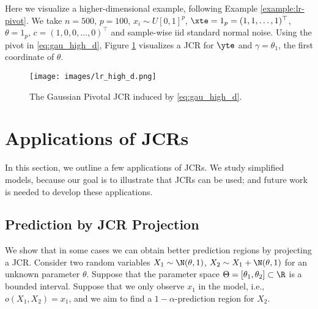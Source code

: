 \documentclass[english]{article}
\begin{document}
Here we visualize a 
higher-dimensional example, following Example \ref{example:lr-pivot}.
We take $n=500$, $p=100$, $x_i \sim U[0,1]^p$, $\xte = 1_p = (1,1,\ldots,1)^\top$, $\theta = 1_p$, $c=(1,0,0,\ldots,0)^\top$ and sample-wise iid standard normal noise.
Using the pivot in \eqref{eq:gau_high_d}, Figure \ref{fig:lr_high_d} visualizes a JCR for $\yte$ and $\gamma = \theta_1$, 
the first coordinate of $\theta$.  

\begin{figure}[ht]
    \centering
    \texttt{[image: images/lr\_high\_d.png]}
\caption{The Gaussian Pivotal JCR induced by \eqref{eq:gau_high_d}.}
\label{fig:lr_high_d}
\end{figure}
\fi

\section{Applications of JCRs}\label{sec:application}

In this section, we outline a few applications of JCRs.
We study simplified models, because our goal is to illustrate that JCRs can be used; and future work is needed to develop these applications.

\subsection{Prediction by JCR Projection}\label{sec:toy_jcr_pred}
We show that in some cases we can obtain better prediction regions by projecting a JCR.
Consider two random variables $X_1 \sim \N(\theta,1)$, $X_2 \sim X_1 + \N(\theta,1)$ for an unknown parameter $\theta$.
Suppose that the parameter space $\Theta = [\theta_1, \theta_2] \subset \R$ is a  bounded interval. 
Suppose that we only observe $x_1$ in the model, i.e., $o(X_1,X_2) = x_1$, and we aim to find a $1-\alpha$-prediction region for $X_2$.
\end{document}
